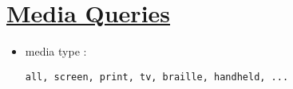 \hypertarget{media-queries7}{%
\section{\texorpdfstring{\href{https://developer.mozilla.org/fr/docs/CSS/Media_queries}{Media
Queries}}{Media Queries}}\label{media-queries7}}

\begin{itemize}
\tightlist
\item
  media type :
  \begin{otherlanguage}{english}\texttt{all,\ screen,\ print,\ tv,\ braille,\ handheld,\ ...}\end{otherlanguage}
\end{itemize}

\begin{otherlanguage}{english}

\begin{Shaded}
\begin{Highlighting}[]
 \KeywordTok{/>}
 \KeywordTok{/>}
\end{Highlighting}
\end{Shaded}

\end{otherlanguage}

